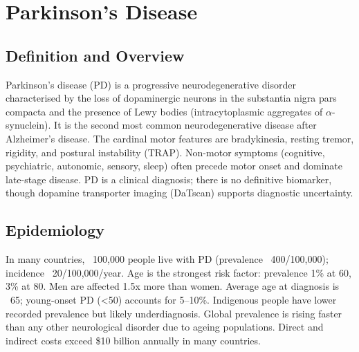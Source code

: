 \chapter{Parkinson's Disease}

\section*{Definition and Overview}
Parkinson's disease (PD) is a progressive neurodegenerative disorder characterised by the loss of dopaminergic neurons in the substantia nigra pars compacta and the presence of Lewy bodies (intracytoplasmic aggregates of $\alpha$-synuclein). It is the second most common neurodegenerative disease after Alzheimer's disease. The cardinal motor features are bradykinesia, resting tremor, rigidity, and postural instability (TRAP). Non-motor symptoms (cognitive, psychiatric, autonomic, sensory, sleep) often precede motor onset and dominate late-stage disease. PD is a clinical diagnosis; there is no definitive biomarker, though dopamine transporter imaging (DaTscan) supports diagnostic uncertainty.

\section*{Epidemiology}
In many countries, ~100,000 people live with PD (prevalence ~400/100,000); incidence ~20/100,000/year. Age is the strongest risk factor: prevalence 1\% at 60, 3\% at 80. Men are affected 1.5x more than women. Average age at diagnosis is ~65; young-onset PD (<50) accounts for 5--10\%. Indigenous people have lower recorded prevalence but likely underdiagnosis. Global prevalence is rising faster than any other neurological disorder due to ageing populations. Direct and indirect costs exceed \$10 billion annually in many countries.

